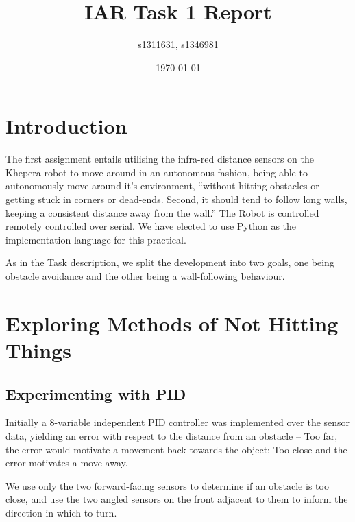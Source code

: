 \documentclass[11pt, a4paper]{article}
\begin{document}
\title{IAR Task 1 Report}
\author{s1311631, s1346981}
\date{\today}
\maketitle


\section{Introduction}

The first assignment entails utilising the infra-red distance sensors on the Khepera 
robot to move around in an autonomous fashion, being able to autonomously move around 
it's environment, ``without hitting obstacles or getting stuck in corners or dead-ends. 
Second, it should tend to follow long walls, keeping a consistent distance away from 
the wall.'' The Robot is controlled remotely controlled over serial. We have 
elected to use Python as the implementation language for this practical.

As in the Task description, we split the development into two goals, one being obstacle 
avoidance and the other being a wall-following behaviour.


\section{Exploring Methods of Not Hitting Things}

\subsection{Experimenting with PID}


Initially a 8-variable independent PID controller was implemented over the sensor data, 
yielding an error with respect to the distance from an obstacle -- Too far, the error would 
motivate a movement back towards the object; Too close and the error motivates a move away.

We use only the two forward-facing sensors to determine if an obstacle is too close, 
and use the two angled sensors on the front adjacent to them to inform the direction in 
which to turn.
\end{document}
